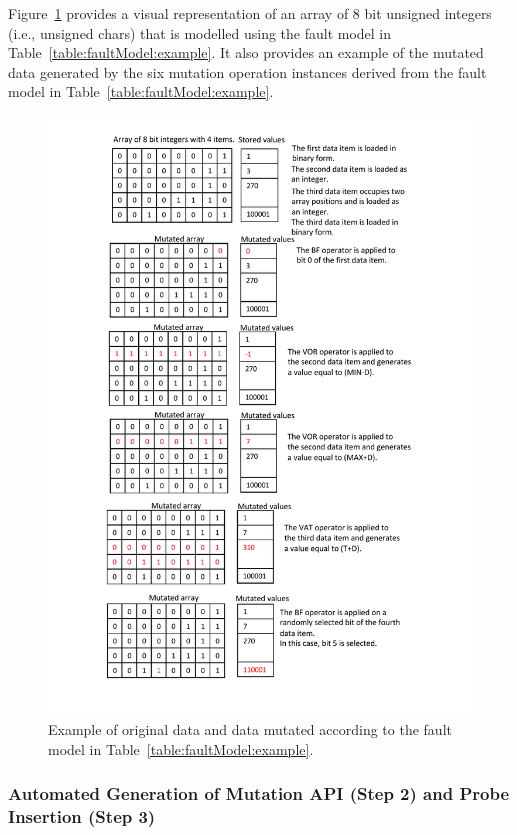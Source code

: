 Figure~\ref{fig:dataMutationFMExamples} provides a visual representation of an array of 8 bit unsigned integers (i.e., unsigned chars) that is modelled using the  fault model in Table~\ref{table:faultModel:example}. It also provides an example of the mutated data generated by the six mutation operation instances derived from the fault model in Table~\ref{table:faultModel:example}.




\begin{figure}[h]
  \centering
    \includegraphics[width=12cm]{images/dataMutationFMExample.pdf}
      \caption{Example of original data and  data mutated according to the fault model in Table~\ref{table:faultModel:example}.}
      \label{fig:dataMutationFMExamples}
\end{figure}





\clearpage


\subsubsection{Automated Generation of Mutation API (Step 2) and Probe Insertion (Step 3)}
\label{sec:generateAPI}

